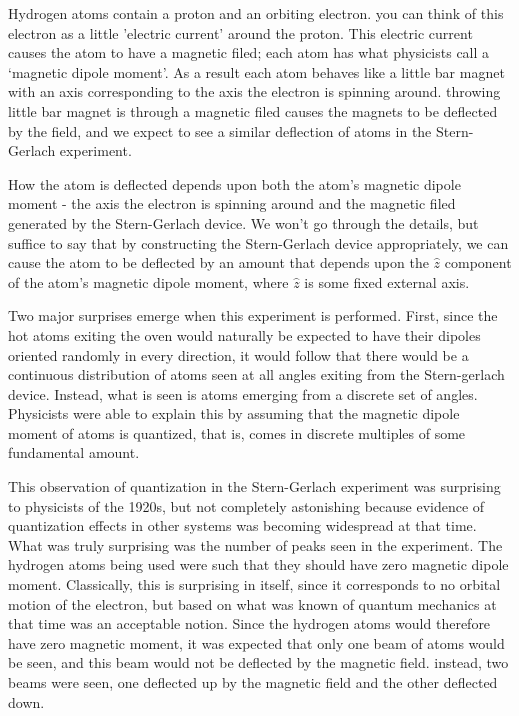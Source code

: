 Hydrogen atoms contain a proton and an orbiting electron. you can think of this electron as a little 'electric current' around the proton. This electric current causes the atom to have a magnetic filed; each atom has what physicists call a `magnetic dipole moment'. As a result each atom behaves like a little bar magnet with an axis corresponding to the axis the electron is spinning around. throwing little bar magnet is through a magnetic filed causes the magnets to be deflected by the field, and we expect to see a similar deflection of atoms in the Stern-Gerlach experiment.

How the atom is deflected depends upon both the atom's magnetic dipole moment - the axis the electron is spinning around and the magnetic filed generated by the Stern-Gerlach device. We won't go through the details, but suffice to say that by constructing the Stern-Gerlach device appropriately, we can cause the atom to be deflected by an amount that depends upon the $\hat{z}$ component of the atom's magnetic dipole moment, where $\hat{z}$ is some fixed external axis.

Two major surprises emerge when this experiment is performed. First, since the hot atoms exiting the oven would naturally be expected to have their dipoles oriented randomly in every direction, it would follow that there would be a continuous distribution of atoms seen at all angles exiting from the Stern-gerlach device. Instead, what is seen is atoms emerging from a discrete set of angles. Physicists were able to explain this by assuming that the magnetic dipole moment of atoms is quantized, that is, comes in discrete multiples of some fundamental amount.

This observation of quantization in the Stern-Gerlach experiment was surprising to physicists of the 1920s, but not completely astonishing because evidence of quantization effects in other systems was becoming widespread at that time. What was truly surprising was the number of peaks seen in the experiment. The hydrogen atoms being used were such that they should have zero magnetic dipole moment. Classically, this is surprising in itself, since it corresponds to no orbital motion of the electron, but based on what was known of quantum mechanics at that time was an acceptable notion. Since the hydrogen atoms would therefore have zero magnetic moment, it was expected that only one beam of atoms would be seen, and this beam would not be deflected by the magnetic field. instead, two beams were seen, one deflected up by the magnetic field and the other deflected down.

